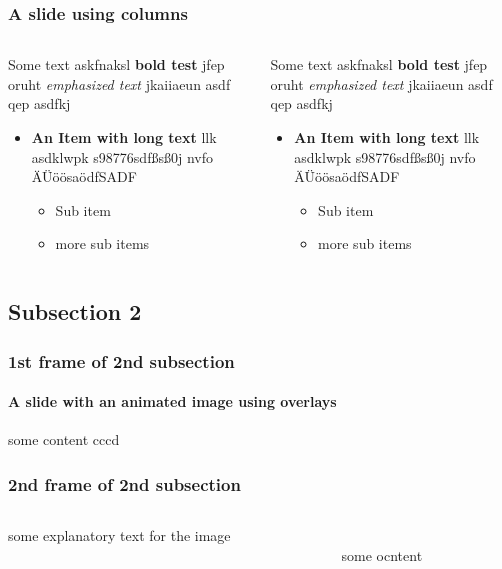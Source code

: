 \documentclass[german,aspectratio=169,titlestyle=white]{tudbeamer}
\begin{document}
\begin{frame}
	\frametitle{A slide using columns}
	\begin{columns}
	   	\begin{column}{.5\textwidth}
	   		Some text askfnaksl \textbf{bold test} jfep oruht \emph{emphasized text} jkaiiaeun asdf qep  asdfkj  
	   		\begin{itemize}
	   			\item \textbf{An Item with long text} llk asdklwpk s98776sdfßsß0j nvfo ÄÜöösaödfSADF
	   			\begin{itemize}
	   				\item Sub item
	   				\item more sub items
	   			\end{itemize}
	   		\end{itemize}
		\end{column}
	   	\begin{column}{.5\textwidth}
	   		Some text askfnaksl \textbf{bold test} jfep oruht \emph{emphasized text} jkaiiaeun asdf qep  asdfkj  
	   		\begin{itemize}
	   			\item \textbf{An Item with long text} llk asdklwpk s98776sdfßsß0j nvfo ÄÜöösaödfSADF
	   			\begin{itemize}
	   				\item Sub item
	   				\item more sub items
	   			\end{itemize}
	   		\end{itemize}
		\end{column}
	\end{columns}
\end{frame}

\subsection{Subsection 2}
\begin{frame}
	\frametitle{1st frame of 2nd subsection}
	\framesubtitle{A slide with an animated image using overlays}
	\centering
some content
cccd
\end{frame}

\begin{frame}
	\frametitle{2nd frame of 2nd subsection}
	\begin{columns}[t]
		\begin{column}{.2\textwidth}
			some explanatory text for the image
		\end{column}
	   	\begin{column}{.80\textwidth}
	   		\ \\[-2ex]
	   		some ocntent
		\end{column}
	\end{columns}
\end{frame}
\end{document}
